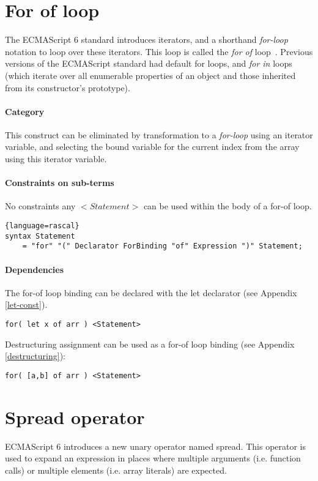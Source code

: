 \section{For of loop} \label{for-of}
The ECMAScript 6 standard introduces iterators, and a shorthand \textit{for-loop} notation to loop over these iterators. This loop is called the \textit{for of} loop~\cite[13.6.4]{SpecJS}. Previous versions of the ECMAScript standard had default for loops, and \textit{for in} loops (which iterate over all enumerable properties of an object and those inherited from its constructor's prototype).

\paragraph{Category}
This construct can be eliminated by transformation to a \textit{for-loop} using an iterator variable, and selecting the bound variable for the current index from the array using this iterator variable.

\paragraph{Constraints on sub-terms}
No constraints any $<Statement>$ can be used within the body of a for-of loop.

\begin{lstlisting}{language=rascal}
syntax Statement
	= "for" "(" Declarator ForBinding "of" Expression ")" Statement;
\end{lstlisting}

\paragraph{Dependencies}
The for-of loop binding can be declared with the let declarator (see Appendix \ref{let-const}).

\begin{lstlisting}
for( let x of arr ) <Statement>
\end{lstlisting}

Destructuring assignment can be used as a for-of loop binding (see Appendix \ref{destructuring}):

\begin{lstlisting}
for( [a,b] of arr ) <Statement>
\end{lstlisting}

\section{Spread operator}
ECMAScript 6 introduces a new unary operator named spread\cite[12.3.6.1]{SpecJS}. This operator is used to expand an expression in places where multiple arguments (i.e. function calls) or multiple elements (i.e. array literals) are expected.

